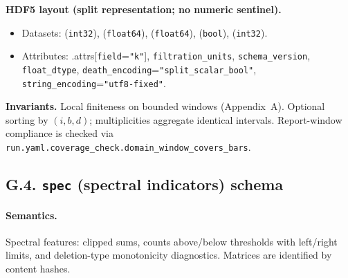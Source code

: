 \documentclass[11pt]{article}
\numberwithin{equation}{section}
\theoremstyle{plain}
\theoremstyle{definition}
\theoremstyle{remark}
\theoremstyle{plain}
\theoremstyle{definition}
\numberwithin{equation}{section}
\theoremstyle{definition}
\numberwithin{equation}{section}
\theoremstyle{plain}
\theoremstyle{definition}
\theoremstyle{remark}
\begin{document}
\noindent\textbf{HDF5 layout (split representation; no numeric sentinel).}
\begin{itemize}[leftmargin=1.25em]
  \item Datasets:
     (\texttt{int32}),
     (\texttt{float64}),
     (\texttt{float64}),
     (\texttt{bool}),
     (\texttt{int32}).
  \item Attributes:
    .attrs[\texttt{field}=\texttt{"k"}],
    \texttt{filtration\_units},
    \texttt{schema\_version},
    \texttt{float\_dtype},
    \texttt{death\_encoding}=\texttt{"split\_scalar\_bool"},
    \texttt{string\_encoding}=\texttt{"utf8-fixed"}.
\end{itemize}

\noindent\textbf{Invariants.} Local finiteness on bounded windows (Appendix~A). Optional sorting by \((i,b,d)\);
multiplicities aggregate identical intervals. Report-window compliance is checked via
\nolinkurl{run.yaml.coverage_check.domain_window_covers_bars}.

\subsection*{G.4. \texttt{spec} (spectral indicators) schema}
\paragraph{Semantics.} Spectral features: clipped sums, counts above/below thresholds with left/right limits,
and deletion-type monotonicity diagnostics. Matrices are identified by content hashes.
\end{document}
